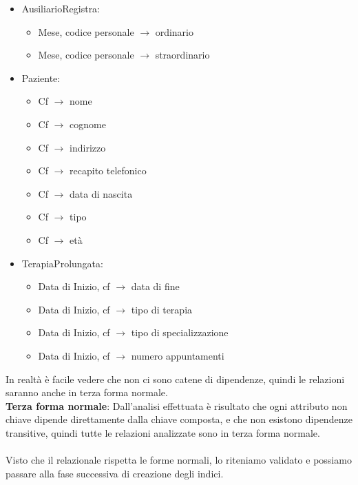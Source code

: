 \documentclass[11pt]{article}
\begin{document}
\begin{itemize}
    \item AusiliarioRegistra:
    \begin{itemize}
        \item Mese, codice personale $\rightarrow$ ordinario
        \item Mese, codice personale $\rightarrow$ straordinario
    \end{itemize}

    \item Paziente:
    \begin{itemize}
        \item Cf $\rightarrow$ nome
        \item Cf $\rightarrow$ cognome
        \item Cf $\rightarrow$ indirizzo
        \item Cf $\rightarrow$ recapito telefonico
        \item Cf $\rightarrow$ data di nascita
        \item Cf $\rightarrow$ tipo
        \item Cf $\rightarrow$ età
    \end{itemize}

    \item TerapiaProlungata:
    \begin{itemize}
        \item Data di Inizio, cf $\rightarrow$ data di fine
        \item Data di Inizio, cf $\rightarrow$ tipo di terapia
        \item Data di Inizio, cf $\rightarrow$ tipo di specializzazione
        \item Data di Inizio, cf $\rightarrow$ numero appuntamenti
    \end{itemize}
\end{itemize}

In realtà è facile vedere che non ci sono catene di dipendenze, quindi le relazioni saranno anche in terza forma normale.\\

\textbf{Terza forma normale}: Dall’analisi effettuata è risultato che ogni attributo non chiave dipende direttamente dalla chiave composta, 
e che non esistono dipendenze transitive, quindi tutte le relazioni analizzate sono in terza forma normale.\\
\\
Visto che il relazionale rispetta le forme normali, lo riteniamo validato e possiamo passare alla fase successiva di creazione degli indici.
\end{document}
